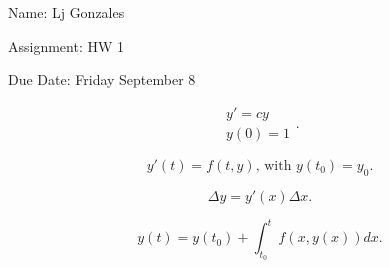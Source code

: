 \documentclass[11 pt]{article}
\begin{document}
    Name: Lj Gonzales

    Assignment: HW 1 

    Due Date: Friday September 8
    \break
\begin{problem}
	\[
		\begin{align}
		y'=cy \\
		y(0)=1	
		\end{align}
			.\] 

		\[
		y'(t)=f(t,y)\text{, with } y(t_0)=y_0
		.\] 

		\[
		\Delta y=y'(x)\Delta x
		.\] 

		\[
		y(t)=y(t_0)+\int_{t_0}^{t}f(x,y(x))dx
		.\] 
\end{problem}
\begin{solution}
\end{solution} 
\pagebreak
\begin{problem}
\end{problem}
\begin{solution}
\end{solution}
\pagebreak
\begin{problem}
\end{problem}
\begin{solution}
\end{solution}
\pagebreak
\begin{problem}
\end{problem}
\begin{solution}
\end{solution}
\pagebreak
\begin{problem}
\end{problem}
\begin{solution}
\end{solution}
\pagebreak
\begin{problem}
\end{problem}
\begin{solution}
\end{solution}
\end{document}
